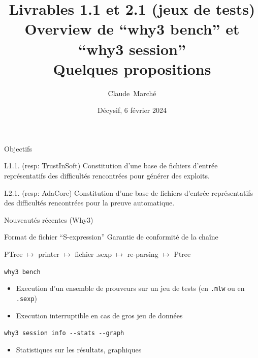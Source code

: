 \documentclass{beamer}
\title{Livrables 1.1 et 2.1 (jeux de tests) \\
  Overview de ``why3 bench'' et ``why3 session''\\
  Quelques propositions}
\author{Claude~Marché\inst{1}}
\institute{\inst{1} Université Paris-Saclay, Inria \& LMF }
\date{Décysif, 6 février 2024}
\newcommand{\why}{\lstinline[language=why3]}
\begin{document}

\begin{frame}{}
  \maketitle
\end{frame}


\begin{frame}{Objectifs}

  \begin{block}{L1.1. (resp: TrustInSoft)}
    Constitution d’une base de fichiers d’entrée représentatifs des
    difficultés rencontrées pour générer des exploits.
  \end{block}

  \begin{block}{L2.1. (resp: AdaCore)}
    Constitution d’une base de fichiers d’entrée représentatifs des
    difficultés rencontrées pour la preuve automatique.
  \end{block}

\end{frame}

\begin{frame}{Nouveautés récentes (Why3)}

  \begin{block}{Format de fichier ``S-expression''}
    Garantie de conformité de la chaîne
    \begin{center}
    PTree $\mapsto$ printer
    $\mapsto$ fichier .sexp $\mapsto$ re-parsing $\mapsto$ Ptree
  \end{center}
  \end{block}


  \begin{block}{\texttt{why3 bench}}
    \begin{itemize}
    \item Execution d'un ensemble de prouveurs sur un jeu de tests
      (en \why{.mlw} ou en \why{.sexp})
    \item Execution interruptible en cas de gros jeu de données
    \end{itemize}

  \end{block}

  \begin{block}{\texttt{why3 session info -{}-stats -{}-graph}}
    \begin{itemize}
    \item Statistiques sur les résultats, graphiques
    \end{itemize}

  \end{block}

\end{frame}
\end{document}
